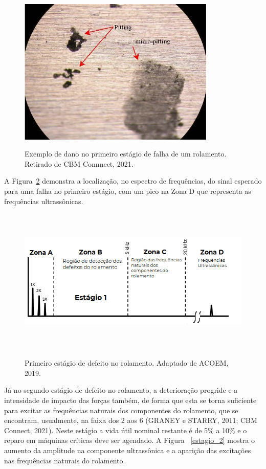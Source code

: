 \documentclass[
	12pt,				
	oneside,			
	a4paper,			
	english,			
	brazil,			
	]{abntex2ppgsi}
\begin{document}
\begin{figure}[H]
\centering
\caption {Exemplo de dano no primeiro estágio de falha de um rolamento. Retirado de CBM Connnect, 2021.}
\includegraphics[width=\textwidth,height=70mm,keepaspectratio]{pitting_pista_externa}
\label{pitting_pista_externa}
\end{figure}

A Figura~\ref{estagio_1} demonstra a localização, no espectro de frequências, do sinal esperado para uma falha no primeiro estágio, com um pico na Zona D que representa as frequências ultrassônicas.  

\begin{figure}[H]
\centering
\caption {Primeiro estágio de defeito no rolamento. Adaptado de ACOEM, 2019.}
\includegraphics[width=\textwidth,height=70mm,keepaspectratio]{estagio_1}
\label{estagio_1}
\end{figure}

Já no segundo estágio de defeito no rolamento, a deterioração progride e a intensidade de impacto das forças também, de forma que esta se torna suficiente para excitar as frequências naturais dos componentes do rolamento, que se encontram, usualmente, na faixa dos \SI{2}{\kilo{\hertz}} aos \SI{6}{\kilo{\hertz}} (GRANEY e STARRY, 2011; CBM Connect, 2021). Neste estágio a vida útil nominal restante é de 5\% a 10\% e o reparo em máquinas críticas deve ser agendado. A Figura ~\ref{estagio_2} mostra o aumento da amplitude na componente ultrassônica e a aparição das excitações nas frequências naturais do rolamento. 
\end{document}
